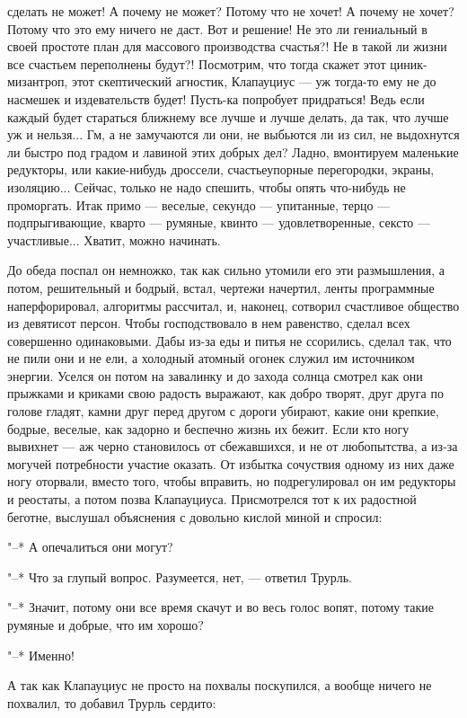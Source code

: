 сделать не может! А почему не может? Потому что не хочет! А
почему не хочет? Потому что это ему ничего не даст. Вот и
решение! Не это ли гениальный в своей простоте план для
массового производства счастья?! Не в такой ли жизни все
счастьем переполнены будут?! Посмотрим, что тогда скажет
этот циник-мизантроп, этот скептический агностик, Клапауциус --- уж
тогда-то ему не до насмешек и издевательств будет!
Пусть-ка попробует придраться! Ведь если каждый будет
стараться ближнему все лучше и лучше делать, да так, что
лучше уж и нельзя... Гм, а не замучаются ли они, не выбьются
ли из сил, не выдохнутся ли быстро под градом и лавиной этих
добрых дел? Ладно, вмонтируем маленькие редукторы, или
какие-нибудь дроссели, счастьеупорные перегородки, экраны,
изоляцию... Сейчас, только не надо спешить, чтобы опять
что-нибудь не проморгать. Итак примо --- веселые, секундо --- упитанные,
терцо --- подпрыгивающие, кварто --- румяные, квинто --- удовлетворенные,
сексто --- участливые... Хватит, можно
начинать.

До обеда поспал он немножко, так как сильно утомили его
эти размышления, а потом, решительный и бодрый, встал,
чертежи начертил, ленты программные наперфорировал,
алгоритмы рассчитал, и, наконец, сотворил счастливое
общество из девятисот персон. Чтобы господствовало в нем
равенство, сделал всех совершенно одинаковыми. Дабы из-за
еды и питья не ссорились, сделал так, что не пили они и не
ели, а холодный атомный огонек служил им источником энергии.
Уселся он потом на завалинку и до захода солнца смотрел как
они прыжками и криками свою радость выражают, как добро
творят, друг друга по голове гладят, камни друг перед другом
с дороги убирают, какие они крепкие, бодрые, веселые, как
задорно и беспечно жизнь их бежит. Если кто ногу вывихнет --- аж
черно становилось от сбежавшихся, и не от любопытства, а
из-за могучей потребности участие оказать. От избытка
сочуствия одному из них даже ногу оторвали, вместо того,
чтобы вправить, но подрегулировал он им редукторы и
реостаты, а потом позва Клапауциуса. Присмотрелся тот к их
радостной беготне, выслушал объяснения с довольно кислой
миной и спросил:

"--* А опечалиться они могут?

"--* Что за глупый вопрос. Разумеется, нет, --- ответил
Трурль.

"--* Значит, потому они все время скачут и во весь голос
вопят, потому такие румяные и добрые, что им хорошо?

"--* Именно!

А так как Клапауциус не просто на похвалы поскупился, а
вообще ничего не похвалил, то добавил Трурль сердито:

